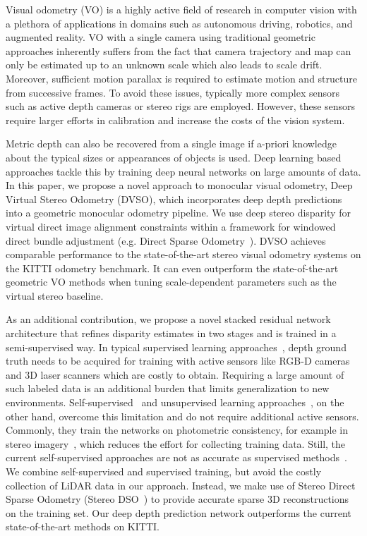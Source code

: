 \documentclass[runningheads]{llncs}
\begin{document}
Visual odometry (VO) is a highly active field of research in computer vision with a plethora of applications in domains such as autonomous driving, robotics, and augmented reality.
VO with a single camera using traditional geometric approaches inherently suffers from the fact that camera trajectory and map can only be estimated up to an unknown scale which also leads to scale drift. 
Moreover, sufficient motion parallax is required to estimate motion and structure from successive frames. 
To avoid these issues, typically more complex sensors such as active depth cameras or stereo rigs are employed. 
However, these sensors require larger efforts in calibration and increase the costs of the vision system.

Metric depth can also be recovered from a single image if a-priori knowledge about the typical sizes or appearances of objects is used. 
Deep learning based approaches tackle this by training deep neural networks on large amounts of data. 
In this paper, we propose a novel approach to monocular visual odometry, Deep Virtual Stereo Odometry (DVSO), which incorporates deep depth predictions into a geometric monocular odometry pipeline.
We use deep stereo disparity for virtual direct image alignment constraints within a framework for windowed direct bundle adjustment (e.g. Direct Sparse Odometry~\cite{engel2017direct}).
DVSO achieves comparable performance to the state-of-the-art stereo visual odometry systems on the KITTI odometry benchmark.
It can even outperform the state-of-the-art geometric VO methods when tuning scale-dependent parameters such as the virtual stereo baseline. 

As an additional contribution, we propose a novel stacked residual network architecture that refines disparity estimates in two stages and is trained in a semi-supervised way.
In typical supervised learning approaches~\cite{eigen2014depth,li2015depth,laina2016deeper}, depth ground truth needs to be
acquired for training with active sensors like RGB-D cameras and 3D laser 
scanners which are costly to obtain.
Requiring a large amount of such labeled data is an additional burden that limits generalization to new environments. 
Self-supervised~\cite{garg2016unsupervised,godard2016unsupervised} and 
unsupervised learning 
approaches~\cite{zhou2017unsupervised}, on the other hand, overcome this 
limitation and do not require additional active sensors. 
Commonly, they train the networks on photometric consistency, for example in stereo imagery~\cite{garg2016unsupervised,godard2016unsupervised}, which reduces the effort for 
collecting training data.
Still, the current self-supervised approaches are not as accurate as supervised 
methods~\cite{kuznietsov2017semi}.
We combine self-supervised and supervised training, but avoid the costly collection of LiDAR data in our approach.
Instead, we make use of Stereo Direct Sparse Odometry (Stereo DSO~\cite{wang2017stereoDSO}) to provide accurate sparse 3D reconstructions on the training set.
Our deep depth prediction network outperforms the current state-of-the-art 
methods on KITTI.
\end{document}
